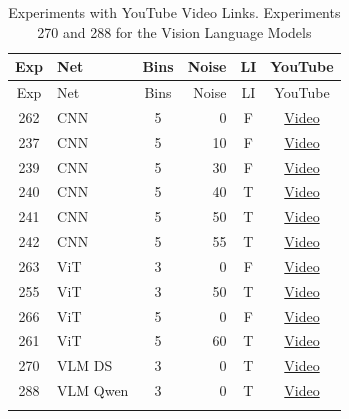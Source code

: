 \begin{longtable}{@{}clcrcc@{}}
\toprule
Exp & Net & Bins & Noise & LI & YouTube \\
\midrule
\endfirsthead
\toprule
Exp & Net & Bins & Noise & LI & YouTube \\
\midrule
\endhead
262 & CNN & 5 & 0 & F & \href{https://youtu.be/vhbmxwMlZfk}{Video} \\
237 & CNN & 5 & 10 & F & \href{https://youtu.be/3Zsny4NM_NQ}{Video} \\
239 & CNN & 5 & 30 & F & \href{https://youtu.be/CzJlbYX0CnQ}{Video} \\
240 & CNN & 5 & 40 & T & \href{https://youtu.be/FVlpiNw26J8}{Video} \\
241 & CNN & 5 & 50 & T & \href{https://youtu.be/O74AcmhYF2Y}{Video} \\
242 & CNN & 5 & 55 & T & \href{https://youtu.be/Ui-xJKEpXRs}{Video} \\
263 & ViT & 3 & 0 & F & \href{https://youtu.be/NvsoVrbx9xA}{Video} \\
255 & ViT & 3 & 50 & T & \href{https://youtu.be/e17e30eX0Rg}{Video} \\
266 & ViT & 5 & 0 & F & \href{https://youtu.be/d1YI4Eko4JE}{Video} \\
261 & ViT & 5 & 60 & T & \href{https://youtu.be/OyENq7Xe88Q}{Video} \\
270 & VLM DS & 3 & 0 & T & \href{https://youtu.be/HbAAoUBcfDw}{Video} \\
288 & VLM Qwen & 3 & 0 & T & \href{https://youtu.be/tY1LgKakAZ4}{Video} \\
\bottomrule
\caption{Experiments with YouTube Video Links. Experiments 270 and 288 for the Vision Language Models}
\label{tab:youtube_links}
\end{longtable}

